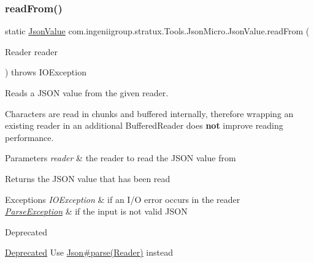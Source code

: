 \subsubsection{\texorpdfstring{read\+From()}{readFrom()}\hspace{0.1cm}{\footnotesize\ttfamily [1/2]}}
{\footnotesize\ttfamily static \hyperlink{classcom_1_1ingeniigroup_1_1stratux_1_1_tools_1_1_json_micro_1_1_json_value}{Json\+Value} com.\+ingeniigroup.\+stratux.\+Tools.\+Json\+Micro.\+Json\+Value.\+read\+From (\begin{DoxyParamCaption}\item[{Reader}]{reader }\end{DoxyParamCaption}) throws I\+O\+Exception\hspace{0.3cm}{\ttfamily [static]}}

Reads a J\+S\+ON value from the given reader. 

Characters are read in chunks and buffered internally, therefore wrapping an existing reader in an additional {\ttfamily Buffered\+Reader} does {\bfseries not} improve reading performance. 


\begin{DoxyParams}{Parameters}
{\em reader} & the reader to read the J\+S\+ON value from \\
\hline
\end{DoxyParams}
\begin{DoxyReturn}{Returns}
the J\+S\+ON value that has been read 
\end{DoxyReturn}

\begin{DoxyExceptions}{Exceptions}
{\em I\+O\+Exception} & if an I/O error occurs in the reader \\
\hline
{\em \hyperlink{classcom_1_1ingeniigroup_1_1stratux_1_1_tools_1_1_json_micro_1_1_parse_exception}{Parse\+Exception}} & if the input is not valid J\+S\+ON \\
\hline
\end{DoxyExceptions}
\begin{DoxyRefDesc}{Deprecated}
\item[\hyperlink{deprecated__deprecated000008}{Deprecated}]Use \hyperlink{classcom_1_1ingeniigroup_1_1stratux_1_1_tools_1_1_json_micro_1_1_json_a74a0f7ea199004578d58033d765481bb}{Json\#parse(\+Reader)} instead \end{DoxyRefDesc}
\mbox{\label{classcom_1_1ingeniigroup_1_1stratux_1_1_tools_1_1_json_micro_1_1_json_value_a2dd5b0d5a1d637df8aa1606fd17f9b84}} 
